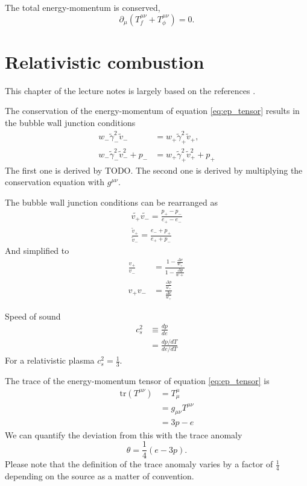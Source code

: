 The total energy-momentum is conserved,
\cite[eq. 5.17]{lecture_notes}
\begin{equation}
\partial_\mu (T_f^{\mu \nu} + T_\phi^{\mu \nu}) = 0.
\label{eq:ep_conservation}
\end{equation}


\section{Relativistic combustion}
This chapter of the lecture notes is largely based on the references
\cites{hindmarsh_gw_pt_2019}{espinosa_energy_2010}.

The conservation of the energy-momentum of equation \ref{eq:ep_tensor} results in the bubble wall junction conditions
\cites[eq. 7.22]{lecture_notes}[eq. B.2-3]{hindmarsh_gw_pt_2019}
\begin{align}
w_- \tilde{\gamma}_-^2 \tilde{v}_- &= w_+ \tilde{\gamma}_+^2 \tilde{v}_+, \\
w_- \tilde{\gamma}_-^2 \tilde{v}_-^2 + p_- &= w_+ \tilde{\gamma}_+^2 \tilde{v}_+^2 + p_+
\end{align}
The first one is derived by TODO.
The second one is derived by multiplying the conservation equation with $g^{\mu \nu}$. 

The bubble wall junction conditions can be rearranged as
\cites[eq. 7.32]{lecture_notes}[eq. 6-7]{giese_2020}
\begin{align}
\tilde{v_+} \tilde{v_-} = \frac{p_+ - p_-}{e_+ - e_-} \\
\frac{\tilde{v}_+}{\tilde{v}_-} = \frac{e_- + p_+}{e_+ + p_-}
\end{align}
And simplified to
\begin{align}
\frac{v_+}{v_-} &= \frac{1 - \frac{\Delta e}{w_+}}{1 - \frac{\Delta p}{w+}} \\
v_+ v_- &= \frac{\frac{\Delta p}{w_+}}{\frac{\Delta e}{w_+}}
\end{align}

Speed of sound
\cites[eq. 13]{giese_2020}[eq. 3]{giese_2021}
\begin{align}
c_s^2
&\equiv \frac{dp}{de} \\
&= \frac{dp/dT}{de/dT}
\end{align}
For a relativistic plasma $c_s^2=\frac{1}{3}$.

The trace of the energy-momentum tensor of equation \ref{eq:ep_tensor} is
\begin{align}
\text{tr} (T^{\mu \nu})
&= T^\mu_\mu \\
&= g_{\mu \nu} T^{\mu \nu} \\
&=3p - e
\end{align}
We can quantify the deviation from this with the trace anomaly
\cites[eq. 7.24]{lecture_notes}[eq. 28]{giese_2020}
\begin{equation}
\theta = \frac{1}{4}(e-3p).
\end{equation}
Please note that the definition of the trace anomaly varies by a factor of $\frac{1}{4}$ depending on the source as a matter of convention.

